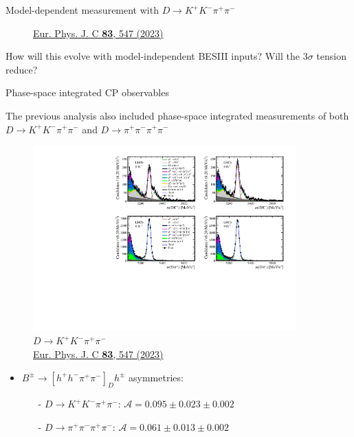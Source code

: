 \documentclass[xcolor={dvipsnames}]{beamer}
\begin{document}
\begin{frame}{Model-dependent measurement with $D\to K^+K^-\pi^+\pi^-$}
\begin{figure}[htb]
\begin{subfigure}{0.5\textwidth}
    \end{subfigure}
    \vspace{-0.5cm}
    \caption*{\tiny\href{https://link.springer.com/article/10.1140/epjc/s10052-023-11560-5}{Eur. Phys. J. C \textbf{83}, 547 (2023)}}
  \end{figure}
  \vspace{-0.5cm}
  \begin{center}
    {\large How will this evolve with model-independent BESIII inputs? Will the $3\sigma$ tension reduce?}
  \end{center}
\end{frame}

\begin{frame}{Phase-space integrated CP observables}
  \begin{center}
    {\large The previous analysis also included phase-space integrated measurements of both $D\to K^+K^-\pi^+\pi^-$ and $D\to\pi^+\pi^-\pi^+\pi^-$}
  \end{center}
  \begin{figure}
    \centering
    \includegraphics[width = 0.9\textwidth,trim={0 7cm 0 0},clip=true]{Plots/d2kkpipi_fiveL_allDP_GLW.pdf}
    \caption*{$D\to K^+K^-\pi^+\pi^-$\\ \tiny\href{https://link.springer.com/article/10.1140/epjc/s10052-023-11560-5}{Eur. Phys. J. C \textbf{83}, 547 (2023)}}
  \end{figure}
  \vspace{-0.5cm}
  \begin{itemize}
    \item{$B^\pm\to[h^+h^-\pi^+\pi^-]_Dh^\pm$ asymmetries:}
    \begin{itemize}
      \item[-]{$D\to K^+K^-\pi^+\pi^-$: $\mathcal{A} = 0.095 \pm 0.023 \pm 0.002$}
      \item[-]{$D\to\pi^+\pi^-\pi^+\pi^-$: $\mathcal{A} = 0.061 \pm 0.013 \pm 0.002$}
    \end{itemize}
  \end{itemize}
\end{frame}
\end{document}
